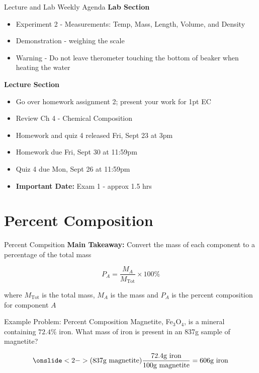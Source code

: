 \documentclass[11pt]{beamer}
\begin{document}
\begin{frame}{Lecture and Lab Weekly Agenda}
  \textbf{Lab Section}

  \begin{itemize}
  \item Experiment 2 - Measurements: Temp, Mass, Length, Volume,
    and Density
  \item Demonstration - weighing the scale
  \item Warning - Do not leave therometer touching the
    bottom of beaker when heating the water
  \end{itemize}

  \textbf{Lecture Section}

  \begin{itemize}
  \item Go over homework assignment 2; present your work
    for 1pt EC
  \item Review Ch 4 - Chemical Composition
  \item Homework and quiz 4 released Fri, Sept 23 at 3pm
  \item Homework due Fri, Sept 30 at 11:59pm
  \item Quiz 4 due Mon, Sept 26 at 11:59pm
  \item \textbf{Important Date:} Exam 1 - approx 1.5 hrs
  \end{itemize}
\end{frame}

\section{Percent Composition}

\begin{frame}{Percent Compsition}
  \textbf{Main Takeaway:} Convert the mass of each component
  to a percentage of the total mass

  \begin{equation}
    P_A = \frac{M_A}{M_\text{Tot}} \times 100\%
  \end{equation}

  where $M_\text{Tot}$ is the total mass, $M_A$ is the mass and $P_A$
  is the percent composition for component $A$
\end{frame}

\begin{frame}{Example Problem: Percent Composition}
  Magnetite, Fe$_3$O$_4$, is a mineral containing $72.4\%$ iron. What
  mass of iron is present in an 837g sample of magnetite?

  \begin{align*}
   \onslide<2->{ (837 \text{g magnetite})\frac{72.4 \text{g iron}}{100 \text{g magnetite}}
    = 606 \text{g iron}}
  \end{align*}
  
\end{frame}
\end{document}

